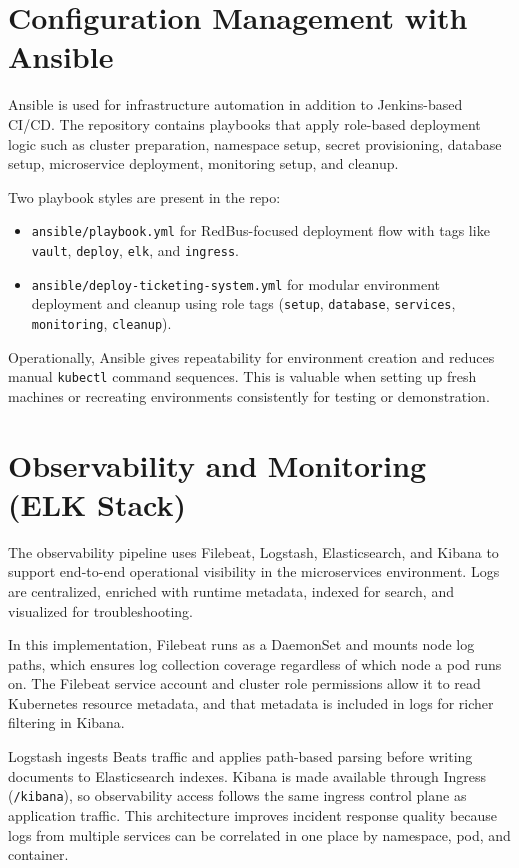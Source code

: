 \documentclass[12pt,a4paper]{article}
\begin{document}
\section{Configuration Management with Ansible}

Ansible is used for infrastructure automation in addition to Jenkins-based CI/CD. The repository contains playbooks that apply role-based deployment logic such as cluster preparation, namespace setup, secret provisioning, database setup, microservice deployment, monitoring setup, and cleanup.

Two playbook styles are present in the repo:
\begin{itemize}
    \item \texttt{ansible/playbook.yml} for RedBus-focused deployment flow with tags like \texttt{vault}, \texttt{deploy}, \texttt{elk}, and \texttt{ingress}.
    \item \texttt{ansible/deploy-ticketing-system.yml} for modular environment deployment and cleanup using role tags (\texttt{setup}, \texttt{database}, \texttt{services}, \texttt{monitoring}, \texttt{cleanup}).
\end{itemize}

Operationally, Ansible gives repeatability for environment creation and reduces manual \texttt{kubectl} command sequences. This is valuable when setting up fresh machines or recreating environments consistently for testing or demonstration.

\section{Observability and Monitoring (ELK Stack)}

The observability pipeline uses Filebeat, Logstash, Elasticsearch, and Kibana to support end-to-end operational visibility in the microservices environment. Logs are centralized, enriched with runtime metadata, indexed for search, and visualized for troubleshooting.

In this implementation, Filebeat runs as a DaemonSet and mounts node log paths, which ensures log collection coverage regardless of which node a pod runs on. The Filebeat service account and cluster role permissions allow it to read Kubernetes resource metadata, and that metadata is included in logs for richer filtering in Kibana.

Logstash ingests Beats traffic and applies path-based parsing before writing documents to Elasticsearch indexes. Kibana is made available through Ingress (\texttt{/kibana}), so observability access follows the same ingress control plane as application traffic. This architecture improves incident response quality because logs from multiple services can be correlated in one place by namespace, pod, and container.
\end{document}
